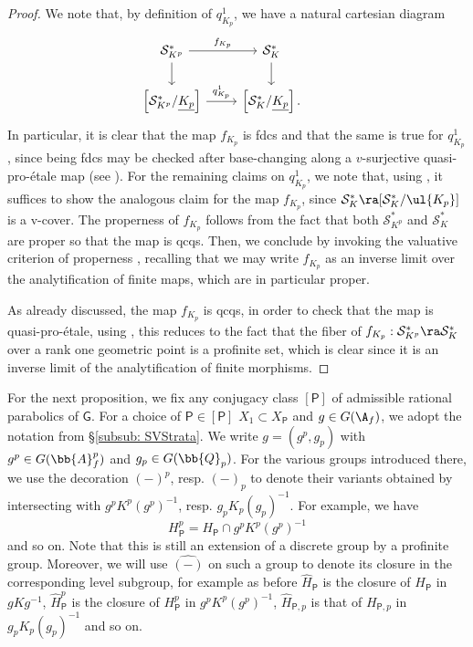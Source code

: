 \documentclass[letterpaper,11pt]{amsart}
\begin{document}
\begin{proof}
We note that, by definition of $q^{1}_{K_{p}}$, we have a natural cartesian diagram 
\[
\begin{tikzcd}
\mathcal{S}_{K^{p}}^{*} \arrow[r,"f_{K_{p}}"] \arrow[d] & \mathcal{S}_{K}^{*} \arrow[d] & \\
\left[\mathcal{S}_{K^{p}}^{*}/\underline{K_{p}}\right] \arrow[r,"q^{1}_{K_{p}}"] & \left[\mathcal{S}_{K}^{*}/\underline{K_{p}}\right]. & 
\end{tikzcd}
\]
In particular, it is clear that the map $f_{K_{p}}$ is fdcs and that the same is true for $q^{1}_{K_{p}}$, since being fdcs may be checked after base-changing along a $v$-surjective quasi-pro-\'etale map (see \cite[Proposition~3.2.7]{GHILZIsocComparison}). For the remaining claims on $q^{1}_{K_{p}}$, we note that, using \cite[Proposition~10.11]{Ecod}, it suffices to show the analogous claim for the map $f_{K_{p}}$, since $\mathcal{S}^{*}_K \ra [\mathcal{S}^{*}_K/\ul{K_{p}}]$ is a v-cover. The properness of $f_{K_p}$ follows from the fact that both $\mathcal{S}^{*}_{K^p}$ and $\mathcal{S}^{*}_K$ are proper so that the map is qcqs. Then, we conclude by invoking the valuative criterion of properness \cite[Proposition~18.3]{Ecod}, recalling that we may write $f_{K_{p}}$ as an inverse limit over the analytification of finite maps, which are in particular proper. 

As already discussed, the map $f_{K_{p}}$ is qcqs, in order to check that the map is quasi-pro-\'etale, using \cite[Lemma~7.19]{Ecod}, this reduces to the fact that the fiber of $f_{K_{p}}: \mathcal{S}^{*}_{K^p} \ra \mathcal{S}^{*}_K$ over a rank one geometric point is a profinite set, which is clear since it is an  inverse limit of the analytification of finite morphisms.
\end{proof}

For the next proposition, we fix any conjugacy class $[\mathsf{P}]$ of admissible rational parabolics of $\mathsf{G}$. For a choice of $\mathsf{P}\in [\mathsf{P}]$ $X_1\subset X_{\mathsf{P}}$ and $g\in G(\A_f)$, we adopt the notation from \S\ref{subsub: SVStrata}. We write $g=(g^p,g_p)$ with $g^p\in G(\bb{A}_f^p)$ and $g_p\in G(\bb{Q}_p)$. For the various groups introduced  there, we use the decoration $(-)^p$, resp. $(-)_p$ to denote their variants obtained by intersecting with $g^pK^p(g^p)^{-1}$, resp. $g_pK_p(g_p)^{-1}$. For example, we have 
\[H_{\mathsf{P}}^p= H_{\mathsf{P}}\cap g^pK^p(g^p)^{-1}\]
and so on. Note that this is still an extension of a discrete group by a profinite group. Moreover, we will use $\hat{(-)}$ on such a group to denote its closure in the corresponding level subgroup, for example as before $\hat{H}_\mathsf{P}$ is the closure of $H_\mathsf{P}$ in $gKg^{-1}$, $\hat{H}^p_\mathsf{P}$ is the closure of $H^p_\mathsf{P}$ in $g^pK^p(g^p)^{-1}$, $\hat{H}_{\mathsf{P},p}$ is that of $H_{\mathsf{P},p}$ in $g_pK_p(g_p)^{-1}$ and so on.
\end{document}
